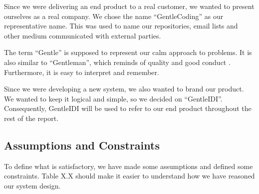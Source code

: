 Since we were delivering an end product to a real customer, we wanted to
present ourselves as a real company. We chose the name
``GentleCoding'' as our
representative name. This was used to name our repositories, email
lists and other medium communicated with external parties.

The term ``Gentle'' is supposed to
represent our calm approach to problems. It is also similar to
``Gentleman'', which reminds of
quality and good conduct . Furthermore, it is easy to interpret and
remember.

Since we were developing a new system, we also wanted to brand our
product. We wanted to keep it logical and simple, so we decided on
``GentleIDI''. Consequently,
GentleIDI will be used to refer to our end product throughout the rest of the report.
\subsection{Assumptions and Constraints}


To define what is satisfactory, we have made some assumptions and
defined some constraints. Table X.X should make it easier to understand
how we have reasoned our system design. 

